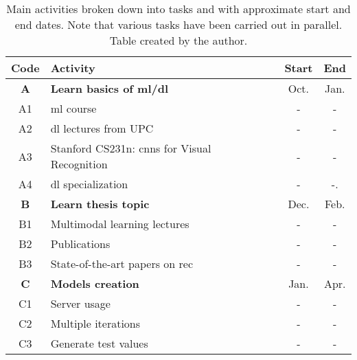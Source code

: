 \begin{table}[p]
  \centering
  \caption[Main activities broken down into tasks]{Main activities broken down
    into tasks and with approximate start and end dates. Note that various
    tasks have been carried out in parallel. Table created by the
    author.}%
  \label{tab:activities}
  \begin{tabular}{cp{}cc}
    \toprule

    \rowcolor{topRowColor}
    \textbf{Code} & \textbf{Activity} & \textbf{Start} & \textbf{End} \\
    \midrule

    \rowcolor{rowColor}
    \textbf{A} & \textbf{Learn basics of \acs{ml}/\acs{dl}}                                      & Oct. & Jan. \\
    \rowcolor{rowColor}
    A1         & \Acs{ml} course~\cite{ng20:machin_learn}                                        & -    & -    \\
    \rowcolor{rowColor}
    A2         & \Acs{dl} lectures from UPC~\cite{giro-i-nieto20:all_deep_learn_upc_etset_telec} & -    & -    \\
    \rowcolor{rowColor}
    A3         & Stanford CS231n: \acsp{cnn} for Visual Recognition~\cite{li20:cs231}            & -    & -    \\
    \rowcolor{rowColor}
    A4         & \Acs{dl} specialization~\cite{ng20:deep_learn_special}                          & -    & -.   \\
    \midrule

    \textbf{B} & \textbf{Learn thesis topic}                                                       & Dec. & Feb. \\
    B1         & Multimodal learning lectures~\cite{giro-i-nieto20:all_deep_learn_upc_etset_telec} & -    & -    \\
    B2         & Publications                                                                      & -    & -    \\
    B3         & State-of-the-art papers on \acs{rec}                                              & -    & -    \\
    \midrule

    \rowcolor{rowColor}
    \textbf{C}             & \textbf{Models creation} & Jan. & Apr. \\
    \rowcolor{rowColor} C1 & Server usage             & -    & -    \\
    \rowcolor{rowColor} C2 & Multiple iterations      & -    & -    \\
    \rowcolor{rowColor} C3 & Generate test values     & -    & -    \\
    \midrule


\end{tabular}
\end{table}
